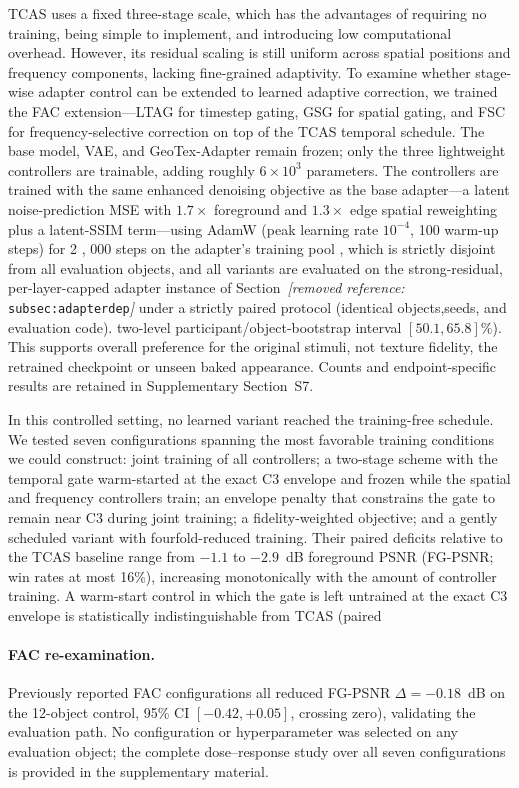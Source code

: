\documentclass[times,twocolumn,final]{elsarticle}
\providecommand{\DIFadd}[1]{{\protect\color{blue} \sf #1}} %
\providecommand{\DIFdel}[1]{{\protect\color{red} \scriptsize #1}} %
\providecommand{\DIFaddbegin}{} %
\providecommand{\DIFaddend}{} %
\providecommand{\DIFdelbegin}{} %
\providecommand{\DIFdelend}{} %
\begin{document}
\DIFdel{TCAS uses a fixed three-stage scale, which has the advantages of requiring no training, being simple to implement, and introducing low computational overhead. However, its residual scaling is still uniform across spatial positions and frequency components, lacking fine-grained adaptivity.
To examine whether stage-wise adapter control can be extended to learned adaptive correction, we trained the FAC extension---LTAG for timestep gating, GSG for spatial gating, and FSC for frequency-selective correction on top of the TCAS temporal schedule. The base model, VAE, and GeoTex-Adapter remain frozen; only the three lightweight controllers are trainable, adding roughly $6\times10^{3}$ parameters. The controllers are trained with the same enhanced denoising objective as the base adapter---a latent noise-prediction MSE with $1.7\times$ foreground and $1.3\times$ edge spatial reweighting plus a latent-SSIM term---using AdamW (peak learning rate $10^{-4}$, 100 warm-up steps) for 2}%
\DIFdel{,}%
\DIFdel{000 steps on the adapter's training pool , which is strictly disjoint from all evaluation objects, and all variants are evaluated on the strong-residual, per-layer-capped adapter instance of Section~\textit{[removed reference: }\texttt{subsec:adapterdep}\textit{]} under a strictly paired protocol (identical objects,seeds, and evaluation code).
}\DIFdelend \DIFaddbegin \DIFadd{two-level participant/object-bootstrap interval $[50.1,65.8]\%$). This supports overall preference for the original stimuli, not texture fidelity, the retrained checkpoint or unseen baked appearance. Counts and endpoint-specific results are retained in Supplementary Section~S7.
}\DIFaddend 

\DIFdelbegin \DIFdel{In this controlled setting, no learned variant reached the training-free schedule. We tested seven configurations spanning the most favorable training conditions we could construct: joint training of all controllers; a two-stage scheme with the temporal gate warm-started at the exact C3 envelope and frozen while the spatial and frequency controllers train; an envelope penalty that constrains the gate to remain near C3 during joint training; a fidelity-weighted objective; and a gently scheduled variant with fourfold-reduced training. Their paired deficits relative to the TCAS baseline range from $-1.1$ to $-2.9$~dB foreground PSNR (FG-PSNR; win rates at most 16\%), increasing monotonically with the amount of controller training. A warm-start control in which the gate is left untrained at the exact C3 envelope is statistically indistinguishable from TCAS (paired }\DIFdelend \DIFaddbegin \paragraph{FAC re-examination.}
\label{subsec:facreported}
\DIFadd{Previously reported FAC configurations all reduced }\DIFaddend FG-PSNR \DIFdelbegin \DIFdel{$\Delta=-0.18$~dB on the 12-object control, 95\% CI $[-0.42,+0.05]$, crossing zero), validating the evaluation path. No configuration or hyperparameter was selected on any evaluation object; the complete dose--response study over all seven configurations is provided in the supplementary material. }%
\end{document}
